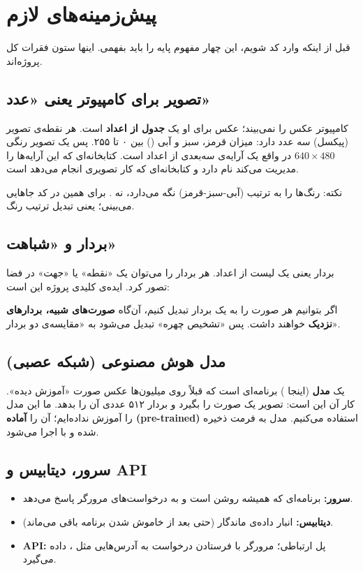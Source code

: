 \documentclass[12pt,a4paper]{article}
\begin{document}
\section{پیش‌زمینه‌های لازم}
قبل از اینکه وارد کد شویم، این چهار مفهوم پایه را باید بفهمی. اینها ستون فقرات کل پروژه‌اند.

\subsection{تصویر برای کامپیوتر یعنی «عدد»}
کامپیوتر عکس را نمی‌بیند؛ عکس برای او یک \textbf{جدول از اعداد} است. هر نقطه‌ی تصویر (پیکسل) سه عدد دارد: میزان قرمز، سبز و آبی () بین ۰ تا ۲۵۵. پس یک تصویر رنگی $640\times480$ در واقع یک آرایه‌ی سه‌بعدی از اعداد است. کتابخانه‌ای که این آرایه‌ها را مدیریت می‌کند  نام دارد و کتابخانه‌ای که کار تصویری انجام می‌دهد  است.

\begin{note}
نکته:  رنگ‌ها را به ترتیب  (آبی-سبز-قرمز) نگه می‌دارد، نه . برای همین در کد جاهایی  می‌بینی؛ یعنی تبدیل ترتیب رنگ.
\end{note}

\subsection{بردار و «شباهت»}
بردار یعنی یک لیست از اعداد. هر بردار را می‌توان یک «نقطه» یا «جهت» در فضا تصور کرد. ایده‌ی کلیدی پروژه این است:
\begin{note}
اگر بتوانیم هر صورت را به یک بردار تبدیل کنیم، آن‌گاه \textbf{صورت‌های شبیه، بردارهای نزدیک} خواهند داشت. پس «تشخیص چهره» تبدیل می‌شود به «مقایسه‌ی دو بردار».
\end{note}

\subsection{مدل هوش مصنوعی (شبکه عصبی)}
یک \textbf{مدل} (اینجا ) برنامه‌ای است که قبلاً روی میلیون‌ها عکس صورت «آموزش دیده». کار آن این است: تصویر یک صورت را بگیرد و بردار ۵۱۲ عددی آن را بدهد. ما این مدل را آموزش نداده‌ایم؛ آن را \textbf{آماده (pre-trained)} استفاده می‌کنیم. مدل به فرمت  ذخیره شده و با  اجرا می‌شود.

\subsection{سرور، دیتابیس و API}
\begin{itemize}[rightmargin=0pt]
  \item \textbf{سرور:} برنامه‌ای که همیشه روشن است و به درخواست‌های مرورگر پاسخ می‌دهد.
  \item \textbf{دیتابیس:} انبار داده‌ی ماندگار (حتی بعد از خاموش شدن برنامه باقی می‌ماند).
  \item \textbf{API:} پل ارتباطی؛ مرورگر با فرستادن درخواست به آدرس‌هایی مثل ، داده می‌گیرد.
\end{itemize}
\end{document}
